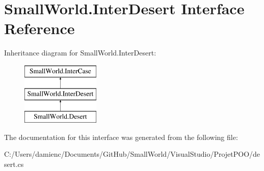 \hypertarget{interface_small_world_1_1_inter_desert}{\section{Small\-World.\-Inter\-Desert Interface Reference}
\label{interface_small_world_1_1_inter_desert}
}
Inheritance diagram for Small\-World.\-Inter\-Desert\-:\begin{figure}[H]
\begin{center}
\leavevmode
\includegraphics[height=3.000000cm]{interface_small_world_1_1_inter_desert}
\end{center}
\end{figure}


The documentation for this interface was generated from the following file\-:\begin{DoxyCompactItemize}
\item 
C\-:/\-Users/damienc/\-Documents/\-Git\-Hub/\-Small\-World/\-Visual\-Studio/\-Projet\-P\-O\-O/desert.\-cs\end{DoxyCompactItemize}
